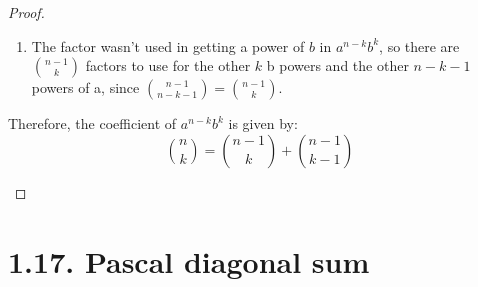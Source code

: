 \begin{proof}
\begin{enumerate}[(a)]
\begin{enumerate}
            \item The factor wasn't used in getting a power of $b$ in $a^{n - k}b^k$, so there are 
                $\binom{n - 1}{k}$ factors to use for the other $k$ b powers and the other $n - k - 1$ 
                powers of a, since $\binom{n - 1}{n - k - 1} = \binom{n - 1}{k}$.
        \end{enumerate}

    Therefore, the coefficient of $a^{n-k}b^k$ is given by:
    \[
        \binom{n}{k} = \binom{n - 1}{k} + \binom{n - 1}{k - 1}
    \] 
    \end{enumerate}
\end{proof}

\section*{1.17. Pascal diagonal sum}
